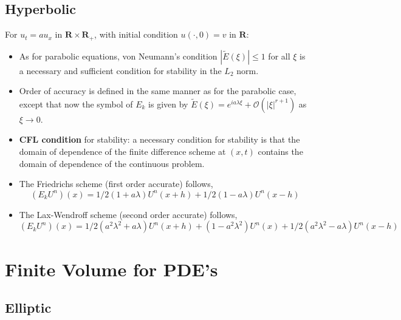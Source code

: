 \documentclass[oneside,a4paper,11pt]{report}
\begin{document}
\chapter{Hyperbolic}
For $u_t = au_x$ in $\mathbf{R}\times\mathbf{R_+}$, with initial condition $u(\cdot,0) = v$ in $\mathbf{R}$:
\begin{itemize}
\item As for parabolic equations, von Neumann's condition $|\tilde{E}(\xi)| \le 1$ for all $\xi$ is a necessary and sufficient condition for stability in the $L_2$ norm. 

\item Order of accuracy is defined in the same manner as for the parabolic case, except that now the symbol of $E_k$ is given by $\tilde{E}(\xi) = e^{ia\lambda\xi} + \mathcal{O}(|\xi|^{r+1})$ as $\xi \to 0$.

\item \textbf{CFL condition} for stability: a necessary condition for stability is that the domain of dependence of the finite difference scheme at $(x,t)$ contains the domain of dependence of the continuous problem.

\item The Friedrichs scheme (first order accurate) follows,
$$(E_kU^n)(x) = 1/2(1+a\lambda)U^n(x+h) + 1/2(1-a\lambda)U^n(x-h)$$

\item The Lax-Wendroff scheme (second order accurate) follows,
$$(E_kU^n)(x) = 1/2(a^2\lambda^2+a\lambda)U^n(x+h) + (1-a^2\lambda^2)U^n(x) + 1/2(a^2\lambda^2-a\lambda)U^n(x-h)$$
\end{itemize}


\part{Finite Volume for PDE's}

\chapter{Elliptic}
\end{document}
